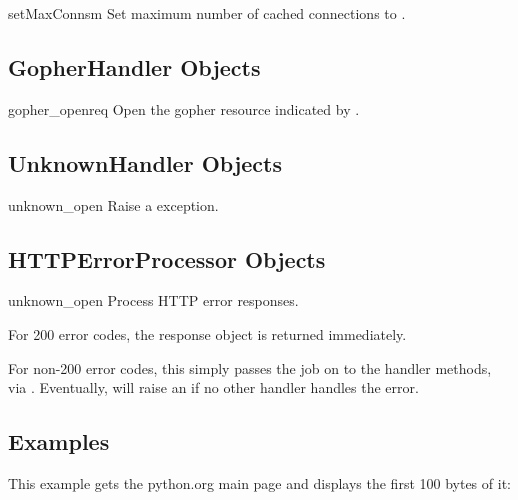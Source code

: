\begin{methoddesc}[CacheFTPHandler]{setMaxConns}{m}
Set maximum number of cached connections to .
\end{methoddesc}


\subsection{GopherHandler Objects \label{gopher-handler}}

\begin{methoddesc}[GopherHandler]{gopher_open}{req}
Open the gopher resource indicated by .
\end{methoddesc}


\subsection{UnknownHandler Objects \label{unknown-handler-objects}}

\begin{methoddesc}[UnknownHandler]{unknown_open}{}
Raise a  exception.
\end{methoddesc}


\subsection{HTTPErrorProcessor Objects \label{http-error-processor-objects}}


\begin{methoddesc}[HTTPErrorProcessor]{unknown_open}{}
Process HTTP error responses.

For 200 error codes, the response object is returned immediately.

For non-200 error codes, this simply passes the job on to the
 handler methods, via
.  Eventually,
 will raise an
 if no other handler handles the error.
\end{methoddesc}


\subsection{Examples \label{urllib2-examples}}

This example gets the python.org main page and displays the first 100
bytes of it:

